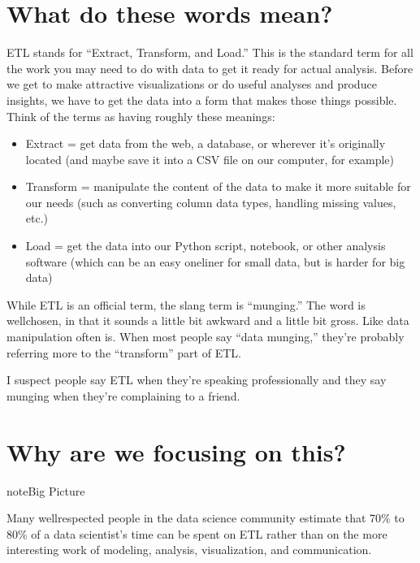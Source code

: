 \documentclass[letterpaper,10pt,english]{sphinxmanual}
\begin{document}
\section{What do these words mean?}
\label{\detokenize{chapter-13-etl:what-do-these-words-mean}}
ETL stands for “Extract, Transform, and Load.”  This is the standard term for all the work you may need to do with data to get it ready for actual analysis.  Before we get to make attractive visualizations or do useful analyses and produce insights, we have to get the data into a form that makes those things possible.  Think of the terms as having roughly these meanings:
\begin{itemize}
\item {} 
Extract = get data from the web, a database, or wherever it’s originally located (and maybe save it into a CSV file on our computer, for example)

\item {} 
Transform = manipulate the content of the data to make it more suitable for our needs (such as converting column data types, handling missing values, etc.)

\item {} 
Load = get the data into our Python script, notebook, or other analysis software (which can be an easy one\sphinxhyphen{}liner for small data, but is harder for big data)

\end{itemize}

While ETL is an official term, the slang term is “munging.”  The word is well\sphinxhyphen{}chosen, in that it sounds a little bit awkward and a little bit gross.  Like data manipulation often is.  When most people say “data munging,” they’re probably referring more to the “transform” part of ETL.

I suspect people say ETL when they’re speaking professionally and they say munging when they’re complaining to a friend.


\section{Why are we focusing on this?}
\label{\detokenize{chapter-13-etl:why-are-we-focusing-on-this}}
\begin{sphinxadmonition}{note}{Big Picture}

Many well\sphinxhyphen{}respected people in the data science community estimate that 70\% to 80\% of a data scientist’s time can be spent on ETL rather than on the more interesting work of modeling, analysis, visualization, and communication.
\end{sphinxadmonition}
\end{document}
